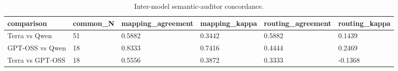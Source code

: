 \begin{table}
\caption{Inter-model semantic-auditor concordance.}
\begin{tabular}{llllll}
\toprule
comparison & common\_N & mapping\_agreement & mapping\_kappa & routing\_agreement & routing\_kappa \\
\midrule
Terra vs Qwen & 51 & 0.5882 & 0.3442 & 0.5882 & 0.1439 \\
GPT-OSS vs Qwen & 18 & 0.8333 & 0.7416 & 0.4444 & 0.2469 \\
Terra vs GPT-OSS & 18 & 0.5556 & 0.3872 & 0.3333 & -0.1368 \\
\bottomrule
\end{tabular}
\end{table}
